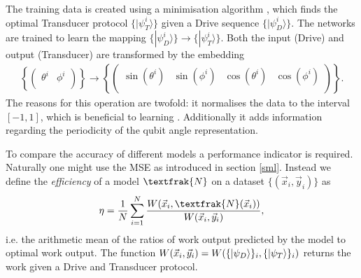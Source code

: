 The training data is created using a minimisation algorithm \cite{2020SciPy-NMeth}, which finds the optimal Transducer protocol $\{|\psi_T^i \rangle\}$ given a Drive sequence $\{|\psi_D^i \rangle\}$.
The networks are trained to learn the mapping $\{|\psi_D^i \rangle\} \to \{|\psi_T^i \rangle\}$.
Both the input (Drive) and output (Transducer) are transformed by the embedding
\begin{align*}
	\left\{
	\begin{pmatrix}
	\theta^i & \phi^i \\
	\end{pmatrix}
	\right\}
	\to
	\left\{
	\begin{pmatrix}
	\sin(\theta^i) & \sin(\phi^i) & \cos(\theta^i)  & \cos(\phi^i) \\
	\end{pmatrix}
	\right\}.
\end{align*}
The reasons for this operation are twofold: it normalises the data to the interval $[-1, 1]$, which is beneficial to learning \cite{LeCun2012}. Additionally it adds information regarding the periodicity of the qubit angle representation.


To compare the accuracy of different models a performance indicator is required. 
Naturally one might use the MSE as introduced in section \ref{sml}.
Instead we define the \textit{efficiency} of a model $\textfrak{N}$ on a dataset $\{(\vec{x}_i, \vec{y}_i)\}$ as
\begin{align}
	\eta = \frac{1}{N} \sum_{i=1}^N \frac{W(\vec{x}_i,\textfrak{N}(\vec{x}_i))}{W(\vec{x}_i,\vec{y}_i)},
\end{align}
i.e. the arithmetic mean of the ratios of work output predicted by the model to optimal work output.
The function $W(\vec{x}_i, \vec{y}_i) = W(\{\ket{\psi_D}\}_i, \{\ket{\psi_T}\}_i)$ returns the work given a Drive and Transducer protocol.